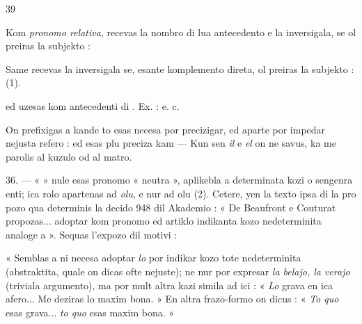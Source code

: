 \begin{VUpage}[43]{39}

Kom \textit{pronomo relativa},  recevas la nombro di lua\nl
antecedento e la  inversigala, se ol preiras la subjekto :\nl
{}\nl
{}

Same  recevas la  inversigala se, esante komplemento\nl
direta, ol preiras la subjekto : \nl
{}\nl
{} (1).

 ed  uzesas kom\nl
antecedenti di . Ex. : \nl
{} e. c.

On prefixigas  a  kande to esas necesa\nl
por precizigar, ed aparte por impedar nejusta refero : \nl
{} ed  esas\nl
plu preciza kam  --- \nl
{}\nl
{} Kun  sen \textit{il} e \textit{el} on ne savus, ka\nl
me parolis al kuzulo od al matro.

\VUsaut{6.14mm}
\VUsaut{4.55mm}

36. --- «  » nule esas pronomo « neutra », aplikebla\nl
a determinata kozi o sengenra enti; ica rolo apartenas ad\nl
\textit{olu}, e nur ad olu (2). Cetere, yen la texto ipsa di la pro\cc
pozo qua determinis la decido 948 dil Akademio : « De\nl
Beaufront e Couturat propozas... adoptar  kom pronomo\nl
ed artiklo indikanta kozo nedeterminita analoge a  ».\nl
Sequas l'expozo dil motivi :

« Semblas a ni necesa adoptar \textit{lo} por indikar kozo tote\nl
nedeterminita (abstraktita, quale on dicas ofte nejuste);\nl
ne nur por expresar \textit{la belajo, la verajo} (triviala argumento),\nl
ma por mult altra kazi simila ad ici : « \textit{Lo} grava en ica\nl
afero... Me deziras lo maxim bona. » En altra frazo-formo\nl
on dicus : « \textit{To quo} esas grava... \textit{to quo} esas maxim bona. »
\parplein
\end{VUpage}

